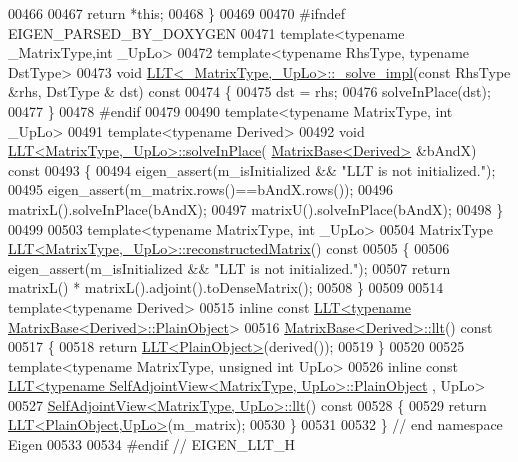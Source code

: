 \begin{DoxyCode}
00466 
00467   \textcolor{keywordflow}{return} *\textcolor{keyword}{this};
00468 \}
00469 
00470 \textcolor{preprocessor}{#ifndef EIGEN\_PARSED\_BY\_DOXYGEN}
00471 \textcolor{keyword}{template}<\textcolor{keyword}{typename} \_MatrixType,\textcolor{keywordtype}{int} \_UpLo>
00472 \textcolor{keyword}{template}<\textcolor{keyword}{typename} RhsType, \textcolor{keyword}{typename} DstType>
00473 \textcolor{keywordtype}{void} \hyperlink{group___cholesky___module_class_eigen_1_1_l_l_t}{LLT<\_MatrixType,\_UpLo>::\_solve\_impl}(\textcolor{keyword}{const} RhsType &rhs, DstType &
      dst)\textcolor{keyword}{ const}
00474 \textcolor{keyword}{}\{
00475   dst = rhs;
00476   solveInPlace(dst);
00477 \}
00478 \textcolor{preprocessor}{#endif}
00479 
00490 \textcolor{keyword}{template}<\textcolor{keyword}{typename} MatrixType, \textcolor{keywordtype}{int} \_UpLo>
00491 \textcolor{keyword}{template}<\textcolor{keyword}{typename} Derived>
00492 \textcolor{keywordtype}{void} \hyperlink{group___cholesky___module_class_eigen_1_1_l_l_t}{LLT<MatrixType,\_UpLo>::solveInPlace}(
      \hyperlink{group___core___module_class_eigen_1_1_matrix_base}{MatrixBase<Derived>} &bAndX)\textcolor{keyword}{ const}
00493 \textcolor{keyword}{}\{
00494   eigen\_assert(m\_isInitialized && \textcolor{stringliteral}{"LLT is not initialized."});
00495   eigen\_assert(m\_matrix.rows()==bAndX.rows());
00496   matrixL().solveInPlace(bAndX);
00497   matrixU().solveInPlace(bAndX);
00498 \}
00499 
00503 \textcolor{keyword}{template}<\textcolor{keyword}{typename} MatrixType, \textcolor{keywordtype}{int} \_UpLo>
00504 MatrixType \hyperlink{group___cholesky___module_a8b6ba1bc41811c50e65cac8db597d802}{LLT<MatrixType,\_UpLo>::reconstructedMatrix}()\textcolor{keyword}{ const}
00505 \textcolor{keyword}{}\{
00506   eigen\_assert(m\_isInitialized && \textcolor{stringliteral}{"LLT is not initialized."});
00507   \textcolor{keywordflow}{return} matrixL() * matrixL().adjoint().toDenseMatrix();
00508 \}
00509 
00514 \textcolor{keyword}{template}<\textcolor{keyword}{typename} Derived>
00515 \textcolor{keyword}{inline} \textcolor{keyword}{const} \hyperlink{group___cholesky___module_class_eigen_1_1_l_l_t}{LLT<typename MatrixBase<Derived>::PlainObject}>
00516 \hyperlink{group___core___module_a90c45f7a30265df792d5aeaddead2635}{MatrixBase<Derived>::llt}()\textcolor{keyword}{ const}
00517 \textcolor{keyword}{}\{
00518   \textcolor{keywordflow}{return} \hyperlink{group___cholesky___module_class_eigen_1_1_l_l_t}{LLT<PlainObject>}(derived());
00519 \}
00520 
00525 \textcolor{keyword}{template}<\textcolor{keyword}{typename} MatrixType, \textcolor{keywordtype}{unsigned} \textcolor{keywordtype}{int} UpLo>
00526 \textcolor{keyword}{inline} \textcolor{keyword}{const} \hyperlink{group___cholesky___module_class_eigen_1_1_l_l_t}{LLT<typename SelfAdjointView<MatrixType, UpLo>::PlainObject}
      , UpLo>
00527 \hyperlink{group___core___module_a405e810491642a7f7b785f2ad6f93619}{SelfAdjointView<MatrixType, UpLo>::llt}()\textcolor{keyword}{ const}
00528 \textcolor{keyword}{}\{
00529   \textcolor{keywordflow}{return} \hyperlink{group___cholesky___module_class_eigen_1_1_l_l_t}{LLT<PlainObject,UpLo>}(m\_matrix);
00530 \}
00531 
00532 \} \textcolor{comment}{// end namespace Eigen}
00533 
00534 \textcolor{preprocessor}{#endif // EIGEN\_LLT\_H}
\end{DoxyCode}
